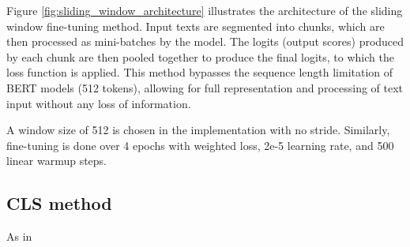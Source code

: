 Figure \ref{fig:sliding_window_architecture} illustrates the architecture of the sliding window fine-tuning method. Input texts are segmented into chunks, which are then processed as mini-batches by the model. The logits (output scores) produced by each chunk are then pooled together to produce the final logits, to which the loss function is applied. This method bypasses the sequence length limitation of BERT models (512 tokens), allowing for full representation and processing of text input without any loss of information.

A window size of 512 is chosen in the implementation with no stride. Similarly, fine-tuning is done over 4 epochs with weighted loss, 2e-5 learning rate, and 500 linear warmup steps.

\subsection{CLS method}

As in \cite{su-2021-classifying,adhikari-2019-docbert}

